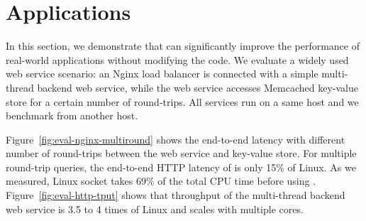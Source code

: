 \section{Applications}
\label{sec:application}


In this section, we demonstrate that \sys{} can significantly improve the performance of real-world applications without modifying the code.
We evaluate a widely used web service scenario: an Nginx load balancer is connected with a simple multi-thread backend web service, while the web service accesses Memcached key-value store for a certain number of round-trips. All services run on a same host and we benchmark from another host.

Figure~\ref{fig:eval-nginx-multiround} shows the end-to-end latency with different number of round-trips between the web service and key-value store.
For multiple round-trip queries, the end-to-end HTTP latency of \sys{} is only 15\% of Linux.
As we measured, Linux socket takes 69\% of the total CPU time before using \libipc.
Figure~\ref{fig:eval-http-tput} shows that \sys{} throughput of the multi-thread backend web service is 3.5 to 4 times of Linux and scales with multiple cores.









